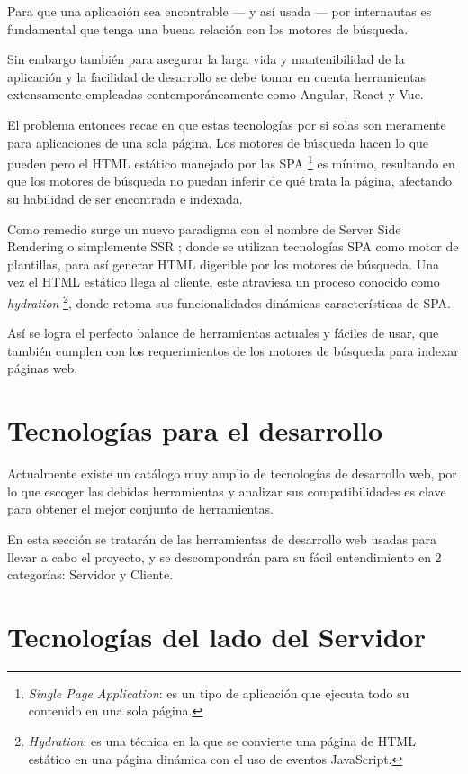 Para que una aplicación sea encontrable — y así usada — por internautas es fundamental que tenga una buena relación con los motores de búsqueda.

Sin embargo también para asegurar la larga vida y mantenibilidad de la aplicación y la facilidad de desarrollo se debe tomar en cuenta herramientas extensamente empleadas contemporáneamente como Angular, React y Vue.

El problema entonces recae en que estas tecnologías por si solas son meramente para aplicaciones de una sola página. Los motores de búsqueda hacen lo que pueden pero el HTML estático manejado por las SPA \footnote{\textit{Single Page Application}: es un tipo de aplicación que ejecuta todo su contenido en una sola página.} es mínimo, resultando en que los motores de búsqueda no puedan inferir de qué trata la página, afectando su habilidad de ser encontrada e indexada.

Como remedio surge un nuevo paradigma con el nombre de Server Side Rendering o simplemente SSR \cite{ServerSideRendering}; donde se utilizan  tecnologías SPA como motor de plantillas, para así generar HTML digerible por los motores de búsqueda. Una vez el HTML estático llega al cliente, este atraviesa un proceso conocido como \textit{hydration} \footnote{\textit{Hydration}: es una técnica en la que se convierte una página de HTML estático en una página dinámica con el uso de eventos JavaScript.}, donde retoma sus funcionalidades dinámicas características de SPA.

Así se logra el perfecto balance de herramientas actuales y fáciles de usar, que también cumplen con los requerimientos de los motores de búsqueda para indexar páginas web.

\section{Tecnologías para el desarrollo}

Actualmente existe un catálogo muy amplio de tecnologías de desarrollo web, por lo que escoger las debidas herramientas y analizar sus compatibilidades es clave para obtener el mejor conjunto de herramientas.

En esta sección se tratarán de las herramientas de desarrollo web usadas para llevar a cabo el proyecto, y se descompondrán para su fácil entendimiento en 2 categorías: Servidor y Cliente.

\section{Tecnologías del lado del Servidor}

